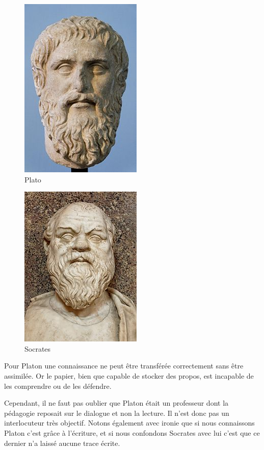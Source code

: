 \begin{minipage}[H]{0.49\linewidth}
  \begin{figure}[H]
  \centering
  \includegraphics[height=0.15\paperheight]{../resources/illustrations/plato2}
  \caption{Plato}
  \end{figure}
\end{minipage}
\begin{minipage}[H]{0.49\linewidth}
  \begin{figure}[H]
  \centering
  \includegraphics[height=0.15\paperheight]{../resources/illustrations/socrates}
  \caption{Socrates}
  \end{figure}
\end{minipage}

Pour Platon une connaissance ne peut être transférée correctement sans être assimilée. Or le papier, bien que capable de stocker des propos, est incapable de les comprendre ou de les défendre.

Cependant, il ne faut pas oublier que Platon était un professeur dont la pédagogie reposait sur le dialogue et non la lecture. Il n'est donc pas un interlocuteur très objectif. Notons également avec ironie que si nous connaissons Platon c'est grâce à l'écriture, et si nous confondons Socrates avec lui c'est que ce dernier n'a laissé aucune trace écrite.

